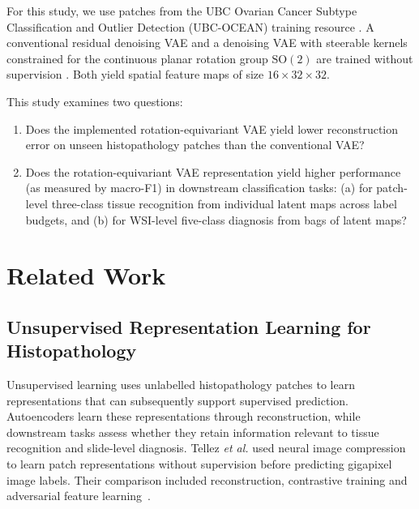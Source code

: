 \documentclass{midl}
\newcommand{\SOtwo}{\mathrm{SO}(2)}
\begin{document}
For this study, we use patches from the UBC Ovarian Cancer Subtype Classification and Outlier Detection (UBC-OCEAN) training resource \cite{ubc_ocean_2023}. A conventional residual denoising VAE and a denoising VAE with steerable kernels constrained for the continuous planar rotation group $\SOtwo$ are trained without supervision \cite{kingma_auto_encoding_2014,im_denoising_2017}. Both yield spatial feature maps of size $16\times32\times32$.

This study examines two questions:

\begin{enumerate}
    \item Does the implemented rotation-equivariant VAE yield lower reconstruction error on unseen histopathology patches than the conventional VAE?
    \item Does the rotation-equivariant VAE representation yield higher performance (as measured by macro-F1) in downstream classification tasks: (a) for patch-level three-class tissue recognition from individual latent maps across label budgets, and (b) for WSI-level five-class diagnosis from bags of latent maps?
\end{enumerate}


\section{Related Work}

\subsection{Unsupervised Representation Learning for Histopathology}
Unsupervised learning uses unlabelled histopathology patches to learn representations that can subsequently support supervised prediction. Autoencoders learn these representations through reconstruction, while downstream tasks assess whether they retain information relevant to tissue recognition and slide-level diagnosis. Tellez \emph{et al.} used neural image compression to learn patch representations without supervision before predicting gigapixel image labels. Their comparison included reconstruction, contrastive training and adversarial feature learning~\cite{tellez_neural_2021}.
\end{document}
